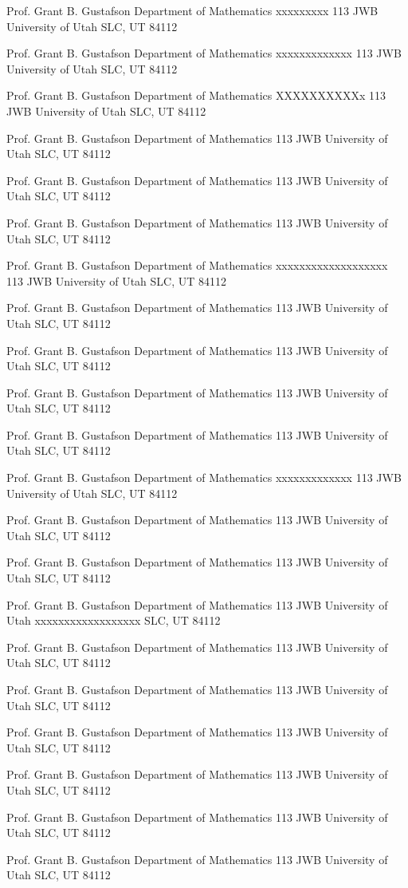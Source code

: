 \documentclass[12pt]{article}
\begin{document}
\normalsize\sf
\begin{labels}
Prof. Grant B. Gustafson
Department of Mathematics  xxxxxxxxx
113 JWB University of Utah
SLC, UT 84112

Prof. Grant B. Gustafson
Department of Mathematics xxxxxxxxxxxxx
113 JWB University of Utah
SLC, UT 84112

Prof. Grant B. Gustafson
Department of Mathematics
XXXXXXXXXXx
113 JWB University of Utah
SLC, UT 84112

Prof. Grant B. Gustafson
Department of Mathematics
113 JWB University of Utah
SLC, UT 84112

Prof. Grant B. Gustafson
Department of Mathematics
113 JWB University of Utah
SLC, UT 84112

Prof. Grant B. Gustafson
Department of Mathematics
113 JWB University of Utah
SLC, UT 84112

Prof. Grant B. Gustafson
Department of Mathematics xxxxxxxxxxxxxxxxxxx
113 JWB University of Utah
SLC, UT 84112

Prof. Grant B. Gustafson
Department of Mathematics
113 JWB University of Utah
SLC, UT 84112

Prof. Grant B. Gustafson
Department of Mathematics
113 JWB University of Utah
SLC, UT 84112

Prof. Grant B. Gustafson
Department of Mathematics
113 JWB University of Utah
SLC, UT 84112

Prof. Grant B. Gustafson
Department of Mathematics
113 JWB University of Utah
SLC, UT 84112

Prof. Grant B. Gustafson
Department of Mathematics xxxxxxxxxxxxx
113 JWB University of Utah
SLC, UT 84112

Prof. Grant B. Gustafson
Department of Mathematics
113 JWB University of Utah
SLC, UT 84112

Prof. Grant B. Gustafson
Department of Mathematics
113 JWB University of Utah
SLC, UT 84112

Prof. Grant B. Gustafson
Department of Mathematics
113 JWB University of Utah xxxxxxxxxxxxxxxxxx
SLC, UT 84112

Prof. Grant B. Gustafson
Department of Mathematics
113 JWB University of Utah
SLC, UT 84112

Prof. Grant B. Gustafson
Department of Mathematics
113 JWB University of Utah
SLC, UT 84112

Prof. Grant B. Gustafson
Department of Mathematics
113 JWB University of Utah
SLC, UT 84112

Prof. Grant B. Gustafson
Department of Mathematics
113 JWB University of Utah
SLC, UT 84112

Prof. Grant B. Gustafson
Department of Mathematics
113 JWB University of Utah
SLC, UT 84112

Prof. Grant B. Gustafson
Department of Mathematics
113 JWB University of Utah
SLC, UT 84112
\end{labels}
\end{document}
